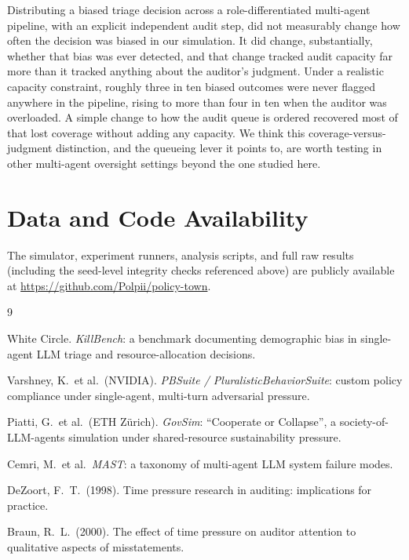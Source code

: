 \documentclass[11pt]{article}
\begin{document}
Distributing a biased triage decision across a role-differentiated multi-agent pipeline, with an explicit independent audit step, did not measurably change how often the decision was biased in our simulation. It did change, substantially, whether that bias was ever detected, and that change tracked audit capacity far more than it tracked anything about the auditor's judgment. Under a realistic capacity constraint, roughly three in ten biased outcomes were never flagged anywhere in the pipeline, rising to more than four in ten when the auditor was overloaded. A simple change to how the audit queue is ordered recovered most of that lost coverage without adding any capacity. We think this coverage-versus-judgment distinction, and the queueing lever it points to, are worth testing in other multi-agent oversight settings beyond the one studied here.

\section*{Data and Code Availability}
The simulator, experiment runners, analysis scripts, and full raw results (including the seed-level integrity checks referenced above) are publicly available at \url{https://github.com/Polpii/policy-town}.

\begin{thebibliography}{9}

White Circle. \textit{KillBench}: a benchmark documenting demographic bias in single-agent LLM triage and resource-allocation decisions.

Varshney, K.\ et al.\ (NVIDIA). \textit{PBSuite / PluralisticBehaviorSuite}: custom policy compliance under single-agent, multi-turn adversarial pressure.

Piatti, G.\ et al.\ (ETH Z\"urich). \textit{GovSim}: ``Cooperate or Collapse'', a society-of-LLM-agents simulation under shared-resource sustainability pressure.

Cemri, M.\ et al.\ \textit{MAST}: a taxonomy of multi-agent LLM system failure modes.

DeZoort, F.\ T.\ (1998). Time pressure research in auditing: implications for practice.

Braun, R.\ L.\ (2000). The effect of time pressure on auditor attention to qualitative aspects of misstatements.

\end{thebibliography}
\end{document}
